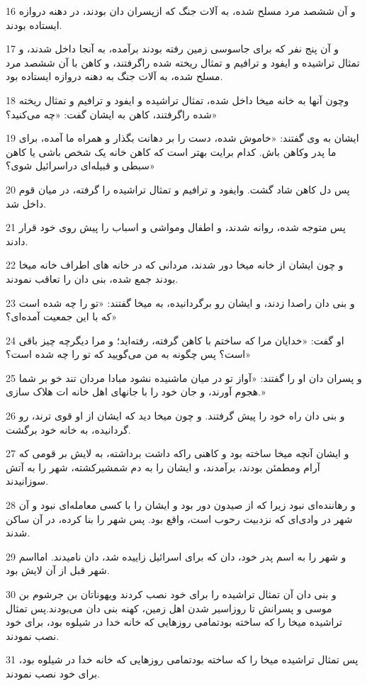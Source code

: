 \par 16 و آن ششصد مرد مسلح شده، به آلات جنگ که ازپسران دان بودند، در دهنه دروازه ایستاده بودند.
\par 17 و آن پنج نفر که برای جاسوسی زمین رفته بودند برآمده، به آنجا داخل شدند، و تمثال تراشیده و ایفود و ترافیم و تمثال ریخته شده راگرفتند، و کاهن با آن ششصد مرد مسلح شده، به آلات جنگ به دهنه دروازه ایستاده بود.
\par 18 وچون آنها به خانه میخا داخل شده، تمثال تراشیده و ایفود و ترافیم و تمثال ریخته شده راگرفتند، کاهن به ایشان گفت: «چه می‌کنید؟»
\par 19 ایشان به وی گفتند: «خاموش شده، دست را بر دهانت بگذار و همراه ما آمده، برای ما پدر وکاهن باش. کدام برایت بهتر است که کاهن خانه یک شخص باشی یا کاهن سبطی و قبیله‌ای دراسرائیل شوی؟»
\par 20 پس دل کاهن شاد گشت. وایفود و ترافیم و تمثال تراشیده را گرفته، در میان قوم داخل شد.
\par 21 پس متوجه شده، روانه شدند، و اطفال ومواشی و اسباب را پیش روی خود قرار دادند.
\par 22 و چون ایشان از خانه میخا دور شدند، مردانی که در خانه های اطراف خانه میخا بودند جمع شده، بنی دان را تعاقب نمودند.
\par 23 و بنی دان راصدا زدند، و ایشان رو برگردانیده، به میخا گفتند: «تو را چه شده است که با این جمعیت آمده‌ای؟»
\par 24 او گفت: «خدایان مرا که ساختم با کاهن گرفته، رفته‌اید؛ و مرا دیگر‌چه چیز باقی است؟ پس چگونه به من می‌گویید که تو را چه شده است؟»
\par 25 و پسران دان او را گفتند: «آواز تو در میان ماشنیده نشود مبادا مردان تند خو بر شما هجوم آورند، و جان خود را با جانهای اهل خانه ات هلاک سازی.»
\par 26 و بنی دان راه خود را پیش گرفتند. و چون میخا دید که ایشان از او قوی ترند، رو گردانیده، به خانه خود برگشت.
\par 27 و ایشان آنچه میخا ساخته بود و کاهنی راکه داشت برداشته، به لایش بر قومی که آرام ومطمئن بودند، برآمدند، و ایشان را به دم شمشیرکشته، شهر را به آتش سوزانیدند.
\par 28 و رهاننده‌ای نبود زیرا که از صیدون دور بود و ایشان را با کسی معامله‌ای نبود و آن شهر در وادی‌ای که نزدبیت رحوب است، واقع بود. پس شهر را بنا کرده، در آن ساکن شدند.
\par 29 و شهر را به اسم پدر خود، دان که برای اسرائیل زاییده شد، دان نامیدند. امااسم شهر قبل از آن لایش بود.
\par 30 و بنی دان آن تمثال تراشیده را برای خود نصب کردند ویهوناتان بن جرشوم بن موسی و پسرانش تا روزاسیر شدن اهل زمین، کهنه بنی دان می‌بودند.پس تمثال تراشیده میخا را که ساخته بودتمامی روزهایی که خانه خدا در شیلوه بود، برای خود نصب نمودند.
\par 31 پس تمثال تراشیده میخا را که ساخته بودتمامی روزهایی که خانه خدا در شیلوه بود، برای خود نصب نمودند.
 
